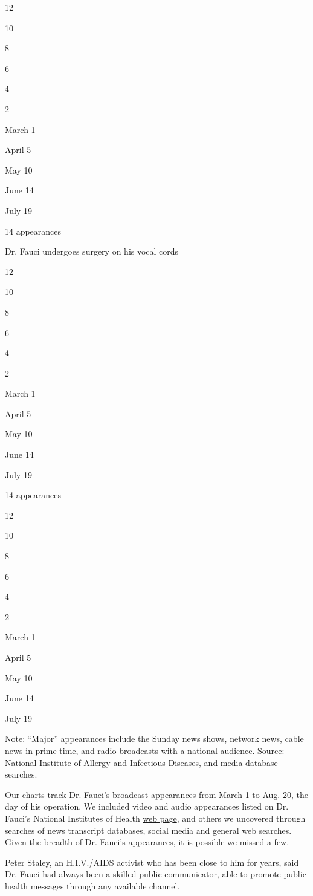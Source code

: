 12

10

8

6

4

2

March 1

April 5

May 10

June 14

July 19

14 appearances

Dr. Fauci undergoes surgery on his vocal cords

12

10

8

6

4

2

March 1

April 5

May 10

June 14

July 19

14 appearances

12

10

8

6

4

2

March 1

April 5

May 10

June 14

July 19

Note: ``Major'' appearances include the Sunday news shows, network news,
cable news in prime time, and radio broadcasts with a national audience.
Source:
\href{https://www.niaid.nih.gov/news-events/director-in-the-news}{National
Institute of Allergy and Infectious Diseases}, and media database
searches.

Our charts track Dr. Fauci's broadcast appearances from March 1 to Aug.
20, the day of his operation. We included video and audio appearances
listed on Dr. Fauci's National Institutes of Health
\href{https://www.niaid.nih.gov/news-events/director-in-the-news}{web
page}, and others we uncovered through searches of news transcript
databases, social media and general web searches. Given the breadth of
Dr. Fauci's appearances, it is possible we missed a few.

Peter Staley, an H.I.V./AIDS activist who has been close to him for
years, said Dr. Fauci had always been a skilled public communicator,
able to promote public health messages through any available channel.

